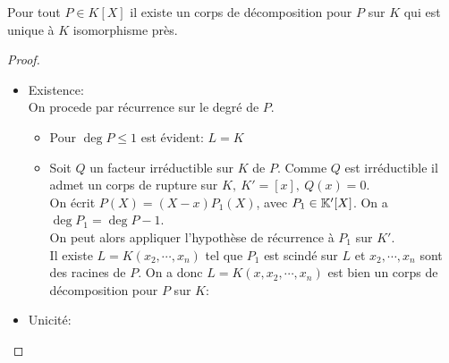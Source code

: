 \begin{theorem}
	Pour tout $P\in K[X]$ il existe un corps de décomposition pour $P$ sur $K$ qui est unique à $K$ isomorphisme près.
\end{theorem}

\begin{proof}
	\begin{itemize}
		\item Existence:\\
		      On procede par récurrence sur le degré de $P$.
		      \begin{itemize}
			      \item Pour $\deg P \leq 1$ est évident: $L = K$
			      \item Soit $Q$ un facteur irréductible sur $K$ de $P$.
			            Comme $Q$ est irréductible il admet un corps de rupture sur $K, \ K' = [x], \ Q(x) = 0$.\\
			            On écrit $P(X) = (X-x)P_1(X)$, avec $P_1 \in \mathbb{K}'[X]$. On a $\deg P_1 = \deg P -1$.\\
			            On peut alors appliquer l'hypothèse de récurrence à $P_1$ sur $K'$.\\
			            Il existe $L = K(x_2, \cdots,  x_n)$ tel que $P_1$ est scindé sur $L$ et
			            $x_2, \cdots, x_n$ sont des racines de $P$. On a donc $L = K(x, x_2, \cdots, x_n)$ est bien un
			            corps de décomposition pour $P$ sur $K$:
		      \end{itemize}
		\item Unicité: %

	\end{itemize}
\end{proof}

